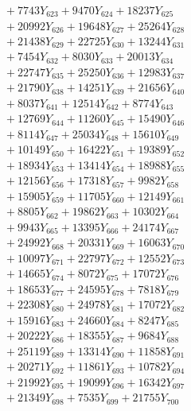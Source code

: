 \documentclass[a4paper,10pt]{article}
\begin{document}
{\begin{align}
&\;  + 7743 Y_{623} + 9470 Y_{624} + 18237 Y_{625} \\[0.3ex]
&\;  + 20992 Y_{626} + 19648 Y_{627} + 25264 Y_{628} \\[0.5ex]\allowbreak
&\;  + 21438 Y_{629} + 22725 Y_{630} + 13244 Y_{631} \\[0.3ex]
&\;  + 7454 Y_{632} + 8030 Y_{633} + 20013 Y_{634} \\[0.3ex]
&\;  + 22747 Y_{635} + 25250 Y_{636} + 12983 Y_{637} \\[0.3ex]
&\;  + 21790 Y_{638} + 14251 Y_{639} + 21656 Y_{640} \\[0.3ex]
&\;  + 8037 Y_{641} + 12514 Y_{642} + 8774 Y_{643} \\[0.3ex]
&\;  + 12769 Y_{644} + 11260 Y_{645} + 15490 Y_{646} \\[0.3ex]
&\;  + 8114 Y_{647} + 25034 Y_{648} + 15610 Y_{649} \\[0.3ex]
&\;  + 10149 Y_{650} + 16422 Y_{651} + 19389 Y_{652} \\[0.3ex]
&\;  + 18934 Y_{653} + 13414 Y_{654} + 18988 Y_{655} \\[0.3ex]
&\;  + 12156 Y_{656} + 17318 Y_{657} + 9982 Y_{658} \\[0.5ex]\allowbreak
&\;  + 15905 Y_{659} + 11705 Y_{660} + 12149 Y_{661} \\[0.3ex]
&\;  + 8805 Y_{662} + 19862 Y_{663} + 10302 Y_{664} \\[0.3ex]
&\;  + 9943 Y_{665} + 13395 Y_{666} + 24174 Y_{667} \\[0.3ex]
&\;  + 24992 Y_{668} + 20331 Y_{669} + 16063 Y_{670} \\[0.3ex]
&\;  + 10097 Y_{671} + 22797 Y_{672} + 12552 Y_{673} \\[0.3ex]
&\;  + 14665 Y_{674} + 8072 Y_{675} + 17072 Y_{676} \\[0.3ex]
&\;  + 18653 Y_{677} + 24595 Y_{678} + 7818 Y_{679} \\[0.3ex]
&\;  + 22308 Y_{680} + 24978 Y_{681} + 17072 Y_{682} \\[0.3ex]
&\;  + 15916 Y_{683} + 24660 Y_{684} + 8247 Y_{685} \\[0.3ex]
&\;  + 20222 Y_{686} + 18355 Y_{687} + 9684 Y_{688} \\[0.5ex]\allowbreak
&\;  + 25119 Y_{689} + 13314 Y_{690} + 11858 Y_{691} \\[0.3ex]
&\;  + 20271 Y_{692} + 11861 Y_{693} + 10782 Y_{694} \\[0.3ex]
&\;  + 21992 Y_{695} + 19099 Y_{696} + 16342 Y_{697} \\[0.3ex]
&\;  + 21349 Y_{698} + 7535 Y_{699} + 21755 Y_{700} \\[0.3ex]

\end{align}}
\end{document}
